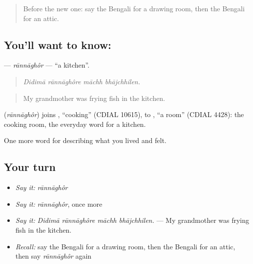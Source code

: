 \label{lesson:BN-C508-rannaghor}



\begin{quote}
Before the new one: say the Bengali for a drawing room, then the Bengali for an attic.
\end{quote}

\subsection*{You'll want to know: }
\textbf{} — \emph{rānnāghôr} — \textquotedblleft{}a kitchen\textquotedblright{}.

\begin{quote}
   
\end{quote}

\begin{quote}
\emph{Didimā rānnāghôre māchh bhājchhilen.}
\end{quote}

\begin{quote}
My grandmother was frying fish in the kitchen.
\end{quote}

\begin{cousinweb}
\textbf{} (\emph{rānnāghôr}) joins , \textquotedblleft{}cooking\textquotedblright{} (CDIAL 10615), to , \textquotedblleft{}a room\textquotedblright{} (CDIAL 4428): the cooking room, the everyday word for a kitchen.
\end{cousinweb}

\begin{grammarlens}[title={What you've built}]
One more word for describing what you lived and felt.
\end{grammarlens}

\subsection*{Your turn}
\begin{itemize}
\raggedright
  \item \emph{Say it:} \emph{rānnāghôr}
  \item \emph{Say it:} \emph{rānnāghôr}, once more
  \item \emph{Say it:} \emph{Didimā rānnāghôre māchh bhājchhilen.} — My grandmother was frying fish in the kitchen.
  \item \emph{Recall:} say the Bengali for a drawing room, then the Bengali for an attic, then say \emph{rānnāghôr} again
\end{itemize}

